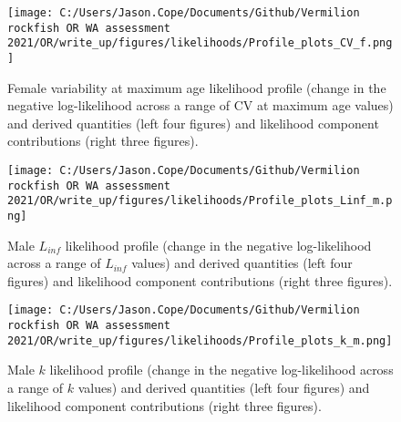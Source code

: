 \documentclass[11pt,
  english,
  a4paper,
]{article}
\begin{document}
\begin{figure}
\centering
\texttt{[image: C:/Users/Jason.Cope/Documents/Github/Vermilion rockfish OR WA assessment 2021/OR/write\_up/figures/likelihoods/Profile\_plots\_CV\_f.png]}
\caption{Female variability at maximum age likelihood profile (change in the negative log-likelihood across a range of CV at maximum age values) and derived quantities (left four figures) and likelihood component contributions (right three figures).\label{fig:CVold_f-profile-combo}}
\end{figure}

\tagmcend\tagstructend


\begin{figure}
\centering
\texttt{[image: C:/Users/Jason.Cope/Documents/Github/Vermilion rockfish OR WA assessment 2021/OR/write\_up/figures/likelihoods/Profile\_plots\_Linf\_m.png]}
\caption{Male {\(L_{inf}\)\leavevmode\tagmcend\tagstructend} likelihood profile (change in the negative log-likelihood across a range of {\(L_{inf}\)\leavevmode\tagmcend\tagstructend} values) and derived quantities (left four figures) and likelihood component contributions (right three figures).\label{fig:Linf_M-profile-combo}}
\end{figure}

\tagmcend\tagstructend


\begin{figure}
\centering
\texttt{[image: C:/Users/Jason.Cope/Documents/Github/Vermilion rockfish OR WA assessment 2021/OR/write\_up/figures/likelihoods/Profile\_plots\_k\_m.png]}
\caption{Male {\(k\)\leavevmode\tagmcend\tagstructend} likelihood profile (change in the negative log-likelihood across a range of {\(k\)\leavevmode\tagmcend\tagstructend} values) and derived quantities (left four figures) and likelihood component contributions (right three figures).\label{fig:k_m-profile-combo}}
\end{figure}
\end{document}
